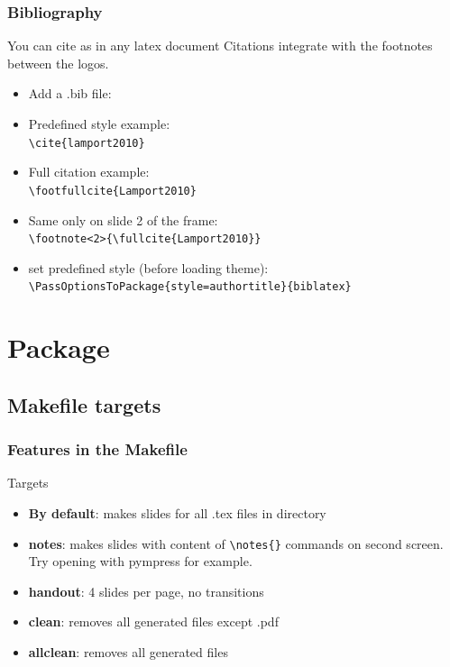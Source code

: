 \documentclass[c,12pt]{beamer}
\begin{document}
\begin{frame}[fragile]
	\frametitle{Bibliography}
	\begin{block}{You can cite as in any latex document}
		Citations integrate with the footnotes between the logos.
		\begin{itemize}
			\item Add a .bib file: \\ \verb||
			\item Predefined style example: \\ \verb|\cite{lamport2010}|
			\item Full citation example: \\ \verb|\footfullcite{Lamport2010}|
			\item Same only on slide 2 of the frame: \\ \verb|\footnote<2>{\fullcite{Lamport2010}}|
			\item set predefined style (before loading theme): \\ \verb|\PassOptionsToPackage{style=authortitle}{biblatex}|
		\end{itemize}
	\end{block}
\end{frame}

\section{Package}
\subsection[make]{Makefile targets}

\begin{frame}[fragile]
	\frametitle[Makefile ft.]{Features in the Makefile}
	\begin{block}{Targets}
		\begin{itemize}
			\item{\textbf{By default}:} makes slides for all .tex files in directory
			\item{\textbf{notes}:} makes slides with content of \verb|\notes{}| commands on second screen.\\ Try opening with pympress for example.
			\item{\textbf{handout}:} 4 slides per page, no transitions
			\item{\textbf{clean}:} removes all generated files except .pdf
			\item{\textbf{allclean}:} removes all generated files
		\end{itemize}
	\end{block}
\end{frame}
\end{document}

